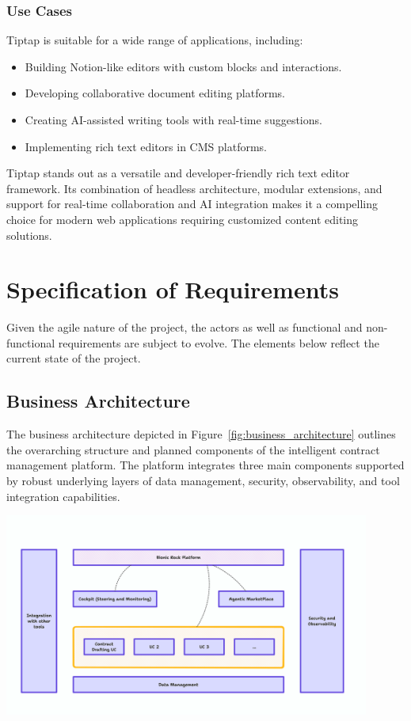 \subsubsection{Use Cases}
Tiptap is suitable for a wide range of applications, including:
\begin{itemize}
    \item Building Notion-like editors with custom blocks and interactions.
    \item Developing collaborative document editing platforms.
    \item Creating AI-assisted writing tools with real-time suggestions.
    \item Implementing rich text editors in CMS platforms. 
\end{itemize}    

Tiptap stands out as a versatile and developer-friendly rich text editor framework. Its combination of headless architecture, modular extensions, and support for real-time collaboration and AI integration makes it a compelling choice for modern web applications requiring customized content editing solutions.

\section{Specification of Requirements}
Given the agile nature of the project, the actors as well as functional and non-functional requirements are subject to evolve. The elements below reflect the current state of the project.

\subsection{Business Architecture}
The business architecture depicted in Figure~\ref{fig:business_architecture} outlines the overarching structure and planned components of the intelligent contract management platform. The platform integrates three main components supported by robust underlying layers of data management, security, observability, and tool integration capabilities.

\begin{center}
    \centering
    \includegraphics[width=0.9\textwidth]{Images/Business Architecture.png}
    \label{fig:business_architecture}
\end{center}

